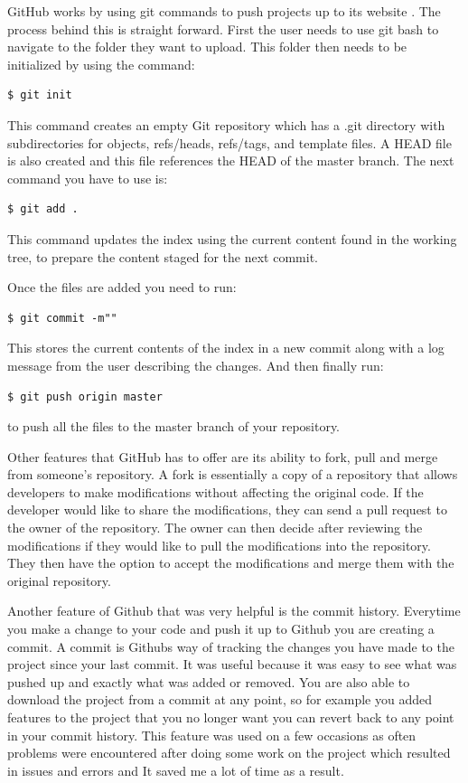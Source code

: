 GitHub works by using git commands to push projects up to its website \cite{gitcommands}. The process behind this is straight forward. First the user needs to use git bash to navigate to the folder they want to upload. This folder then needs to be initialized by using the command:
\begin{verbatim}
$ git init
\end{verbatim}
This command creates an empty Git repository which has a .git directory with subdirectories for objects, refs/heads, refs/tags, and template files. A HEAD file is also created and this file references the HEAD of the master branch.
The next command you have to use is:
\begin{verbatim}
$ git add .
\end{verbatim}

This command updates the index using the current content found in the working tree, to prepare the content staged for the next commit. 

Once the files are added you need to run:

\begin{verbatim}
$ git commit -m""
\end{verbatim}
This stores the current contents of the index in a new commit along with a log message from the user describing the changes. And then finally run:
\begin{verbatim}
$ git push origin master
\end{verbatim}
to push all the files to the master branch of your repository.

Other features that GitHub has to offer are its ability to fork, pull and merge from someone's repository. A fork is essentially a copy of a repository that allows developers to make modifications without affecting the original code.  If the developer would like to share the modifications, they can send a pull request to the owner of the repository. The owner can then decide after reviewing the modifications if they would like to pull the modifications into the repository. They then have the option to accept the modifications and merge them with the original repository.\cite{githubop}

Another feature of Github that was very helpful is the commit history. Everytime you make a change to your code and push it up to Github you are creating a commit. A commit is Githubs way of tracking the changes you have made to the project since your last commit. It was useful because it was easy to see what was pushed up and exactly what was added or removed. You are also able to download the project from a commit at any point, so for example you added features to the project that you no longer want you can revert back to any point in your commit history. This feature was used on a few occasions as often problems were encountered after doing some work on the project which resulted in issues and errors and It saved me a lot of time as a result.


